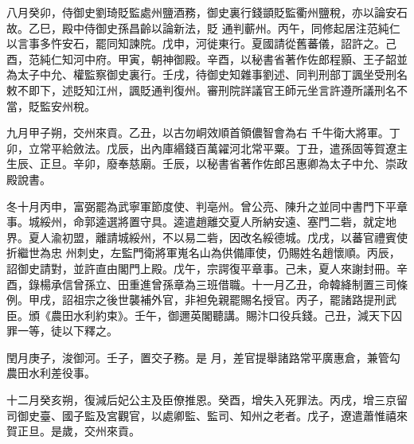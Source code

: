 \begin{pinyinscope}
 八月癸卯，侍御史劉琦貶監處州鹽酒務，御史裏行錢顗貶監衢州鹽稅，亦以論安石故。乙巳，殿中侍御史孫昌齡以論新法，貶
 通判蘄州。丙午，同修起居注范純仁以言事多忤安石，罷同知諫院。戊申，河徙東行。夏國請從舊蕃儀，詔許之。己酉，范純仁知河中府。甲寅，朝神御殿。辛酉，以秘書省著作佐郎程顥、王子韶並為太子中允、權監察御史裏行。壬戌，待御史知雜事劉述、同判刑部丁諷坐受刑名敕不即下，述貶知江州，諷貶通判復州。審刑院詳議官王師元坐言許遵所議刑名不當，貶監安州稅。



 九月甲子朔，交州來貢。乙丑，以古勿峒效順首領儂智會為右
 千牛衛大將軍。丁卯，立常平給斂法。戊辰，出內庫緡錢百萬糴河北常平粟。丁丑，遣孫固等賀遼主生辰、正旦。辛卯，廢奉慈廟。壬辰，以秘書省著作佐郎呂惠卿為太子中允、崇政殿說書。



 冬十月丙申，富弼罷為武寧軍節度使、判亳州。曾公亮、陳升之並同中書門下平章事。城綏州，命郭逵選將置守具。逵遣趙離交夏人所納安遠、塞門二砦，就定地界。夏人渝初盟，離請城綏州，不以易二砦，因改名綏德城。戊戌，以蕃官禮賓使折繼世為忠
 州刺史，左監門衛將軍嵬名山為供備庫使，仍賜姓名趙懷順。丙辰，詔御史請對，並許直由閣門上殿。戊午，宗諤復平章事。己未，夏人來謝封冊。辛酉，錄楊承信曾孫立、田重進曾孫章為三班借職。十一月乙丑，命韓絳制置三司條例。甲戌，詔祖宗之後世襲補外官，非袒免親罷賜名授官。丙子，罷諸路提刑武臣。頒《農田水利約束》。壬午，御邇英閣聽講。賜汴口役兵錢。己丑，減天下囚罪一等，徒以下釋之。



 閏月庚子，浚御河。壬子，置交子務。是
 月，差官提舉諸路常平廣惠倉，兼管勾農田水利差役事。



 十二月癸亥朔，復減后妃公主及臣僚推恩。癸酉，增失入死罪法。丙戌，增三京留司御史臺、國子監及宮觀官，以處卿監、監司、知州之老者。戊子，遼遣蕭惟禧來賀正旦。是歲，交州來貢。



\end{pinyinscope}